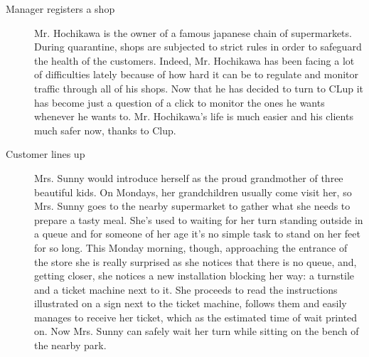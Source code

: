 \begin{description}
    \item[Manager registers a shop]
    Mr. Hochikawa is the owner of a famous japanese chain of supermarkets.
    During quarantine, shops are subjected to strict rules in order to safeguard the health of the customers. Indeed, Mr. Hochikawa has been facing a lot of difficulties lately because of how hard it can be to regulate and monitor traffic through all of his shops. Now that he has decided to turn to CLup it has become just a question of a click to monitor the ones he wants whenever he wants to. Mr. Hochikawa’s life is much easier and his clients much safer now, thanks to Clup.

    \item[Customer lines up]
    Mrs. Sunny would introduce herself as the proud grandmother of three beautiful kids.   
    On Mondays, her grandchildren usually come visit her, so  Mrs. Sunny goes to the nearby supermarket to gather what she needs to prepare a tasty meal. She's used to waiting for her turn standing outside in a queue and for someone of her age it's no simple task to stand on her feet for so long. This Monday morning, though, approaching the entrance of the store she is really surprised as she notices that there is no queue, and, getting closer, she notices a new installation blocking her way: a turnstile and a ticket machine next to it. She proceeds to read the instructions illustrated on a sign next to the ticket machine, follows them and easily manages to receive her ticket, which as the estimated time of wait printed on. Now Mrs. Sunny can safely wait her turn while sitting on the bench of the nearby park. 


\end{description}
